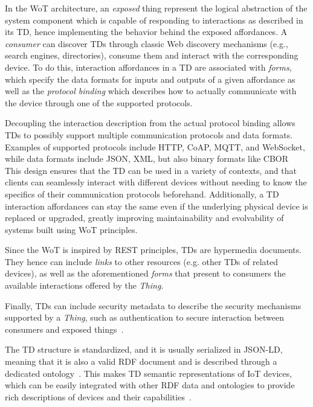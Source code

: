 In the \ac{WoT} architecture, an \emph{exposed} thing represent the logical abstraction of the system component which is capable of responding to interactions as described in its \ac{TD}, hence implementing the behavior behind the exposed affordances. 
%
A \emph{consumer} can discover \acp{TD} through classic Web discovery mechanisms (e.g., search engines, directories), consume them and interact with the corresponding device. 
%
To do this, interaction affordances in a \ac{TD} are associated with \emph{forms}, which specify the data formats for inputs and outputs of a given affordance as well as the \emph{protocol binding} which describes how to actually communicate with the device through one of the supported protocols.

Decoupling the interaction description from the actual protocol binding allows \acp{TD} to possibly support multiple communication protocols and data formats. Examples of supported protocols include \ac{HTTP}, \ac{CoAP}, \ac{MQTT}, and WebSocket, while data formats include JSON, XML, but also binary formats like CBOR~\cite{wot-td}
%
This design ensures that the \ac{TD} can be used in a variety of contexts, and that clients can seamlessly interact with different devices without needing to know the specifics of their communication protocols beforehand. 
%
Additionally, a \ac{TD} interaction affordances can stay the same even if the underlying physical device is replaced or upgraded, greatly improving maintainability and evolvability of systems built using \ac{WoT} principles.

Since the \ac{WoT} is inspired by \ac{REST} principles, \acp{TD} are hypermedia documents. 
%
They hence can include \emph{links} to other resources (e.g. other \acp{TD} of related devices), as well as the aforementioned \emph{forms} that present to consumers the available interactions offered by the \emph{Thing}. 

Finally, \acp{TD} can include security metadata to describe the security mechanisms supported by a \emph{Thing}, such as authentication to secure interaction between consumers and exposed things~\cite{wot-td}. 

The \ac{TD} structure is standardized, and it is usually serialized in JSON-LD, meaning that it is also a valid \ac{RDF} document and is described through a dedicated ontology~\cite{wot-td-ontology,Charpenay_Kabisch_Kosch_2016}.
%
This makes \ac{TD} semantic representations of \ac{IoT} devices, which can be easily integrated with other \ac{RDF} data and ontologies to provide rich descriptions of devices and their capabilities~\cite{Jara_Olivieri_Bocchi_Jung_Kastner_Skarmeta_2014}.

